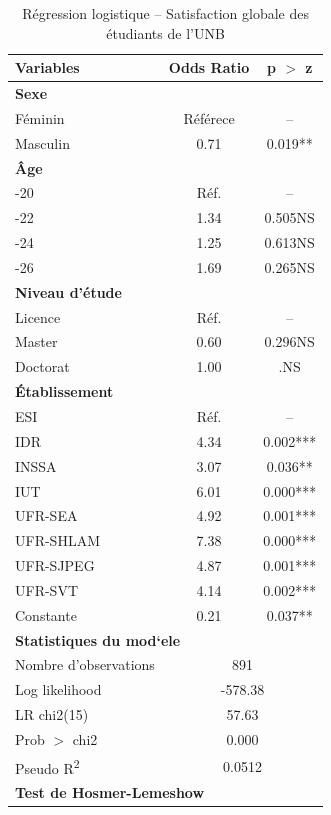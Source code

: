\begin{table}[htbp]
\centering
\caption{Régression logistique -- Satisfaction globale des \'etudiants de l'UNB}
\label{tab:logit_sat}
\begin{tabular}{lcc}
\toprule
\textbf{Variables} & \textbf{Odds Ratio} & \textbf{p $>$ z} \\
\midrule
\multicolumn{3}{l}{\textbf{Sexe}} \\
\quad Féminin & Référece & -- \\
\quad Masculin & 0.71 & 0.019** \\
\midrule
\multicolumn{3}{l}{\textbf{Âge}} \\
\quad 19-20 & R\'ef. & -- \\
\quad 21-22 & 1.34 & 0.505NS \\
\quad 23-24 & 1.25 & 0.613NS \\
\quad 25-26 & 1.69 & 0.265NS \\
\midrule
\multicolumn{3}{l}{\textbf{Niveau d'\'etude}} \\
\quad Licence & R\'ef. & -- \\
\quad Master & 0.60 & 0.296NS \\
\quad Doctorat & 1.00 & .NS \\
\midrule
\multicolumn{3}{l}{\textbf{\'Etablissement}} \\
\quad ESI & R\'ef. & -- \\
\quad IDR & 4.34 & 0.002*** \\
\quad INSSA & 3.07 & 0.036** \\
\quad IUT & 6.01 & 0.000*** \\
\quad UFR-SEA & 4.92 & 0.001*** \\
\quad UFR-SHLAM & 7.38 & 0.000*** \\
\quad UFR-SJPEG & 4.87 & 0.001*** \\
\quad UFR-SVT & 4.14 & 0.002*** \\
\midrule
Constante & 0.21 & 0.037** \\
\midrule
\multicolumn{3}{l}{\textbf{Statistiques du mod`ele}} \\
Nombre d'observations & \multicolumn{2}{c}{891} \\
Log likelihood & \multicolumn{2}{c}{-578.38} \\
LR chi2(15) & \multicolumn{2}{c}{57.63} \\
Prob $>$ chi2 & \multicolumn{2}{c}{0.000} \\
Pseudo R\textsuperscript{2} & \multicolumn{2}{c}{0.0512} \\
\midrule
\multicolumn{3}{l}{\textbf{Test de Hosmer-Lemeshow}} \\

\end{tabular}
\end{table}
